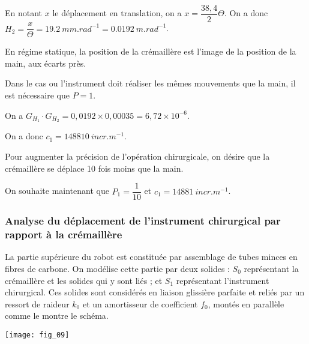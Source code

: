 \begin{multicols}{2}
\ifprof
\begin{corrige}
En notant $x$ le déplacement en translation, on a $x=\dfrac{38,4}{2} \Theta$. On a donc $H_2 =\dfrac{x}{\Theta}=\SI{19,2}{mm.rad^{-1}}=\SI{0,0192}{m.rad^{-1}}$.   
\end{corrige}
\else
\fi

En régime statique, la position de la crémaillère est l’image de la position de la main, aux écarts près. 

\ifprof
\begin{corrige}
Dans le cas ou l'instrument doit réaliser les mêmes mouvements que la main, il est nécessaire que $P=1$. 

On  a $G_{H_1}\cdot G_{H_2} = 0,0192 \times 0,00035 = 6,72\times 10^{-6}$.
 
On a donc $c_1 = \SI{148 810}{incr.m^{-1}}$.
\end{corrige}
\else
\fi

Pour augmenter la précision de l’opération chirurgicale, on désire que la crémaillère se déplace 10 fois moins que la main. 




\ifprof
\begin{corrige}
On souhaite maintenant que $P_1=\dfrac{1}{10}$ et $c_1 = \SI{148 81}{incr.m^{-1}}$.
\end{corrige}
\else
\fi

\subsubsection*{Analyse du déplacement de l’instrument chirurgical par rapport à la crémaillère}
\ifprof
\else
La partie supérieure du robot est constituée par assemblage de tubes minces en fibres de carbone. 
On modélise cette partie par deux solides : $S_0$ représentant la crémaillère et les solides qui y sont liés ;  et $S_1$ représentant l’instrument chirurgical. 
Ces solides sont considérés en liaison glissière parfaite et reliés par un ressort de raideur $k_0$ et un amortisseur de coefficient $f_0$, montés en parallèle comme le montre le schéma.

\begin{center}
\texttt{[image: fig\_09]}
\end{center}


\end{multicols}
